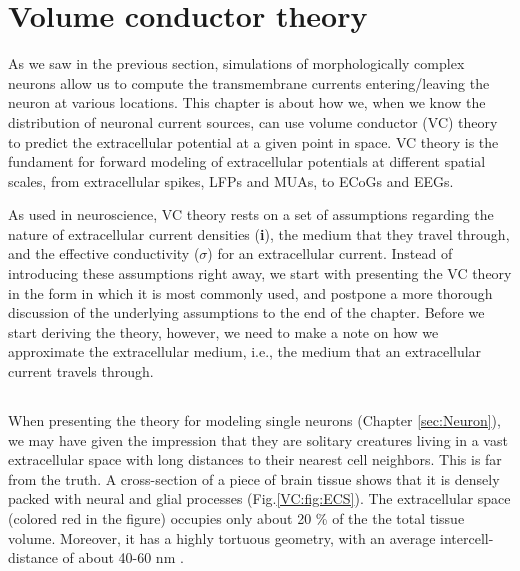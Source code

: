 \section{Volume conductor theory}
\label{sec:VC}
As we saw in the previous section, simulations of morphologically complex neurons allow us to compute the transmembrane currents entering/leaving the neuron at various locations. This chapter is about how we, when we know the distribution of neuronal current sources, can use volume conductor (VC) theory to predict the extracellular potential at a given point in space. VC theory is the fundament for forward modeling of extracellular potentials at different spatial scales, from extracellular spikes, LFPs and MUAs, to ECoGs and EEGs.

As used in neuroscience, VC theory rests on a set of assumptions regarding the nature of extracellular current densities ({\bf i}), the medium that they travel through, and the effective conductivity ($\sigma$)  for an extracellular current. Instead of introducing these assumptions right away, we start with presenting the VC theory in the form in which it is most commonly used, and postpone a more thorough discussion of the underlying assumptions to the end of the chapter. Before we start deriving the theory, however, we need to make a note on how we approximate the extracellular medium, i.e., the medium that an extracellular current travels through.


\subsection{}
\label{sec:VC:continuous}

When presenting the theory for modeling single neurons (Chapter \ref{sec:Neuron}), we may have given the impression that they are solitary creatures living in a vast extracellular space with long distances to their nearest cell neighbors. This is far from the truth. A cross-section of a piece of brain tissue shows that it is densely packed with neural and glial processes (Fig.\ref{VC:fig:ECS}). The extracellular space (colored red in the figure) occupies only about 20 \% of the the total tissue volume. Moreover, it has a highly tortuous  geometry, with an average intercell-distance of about 40-60 nm \citep{Sykova2008}. 

